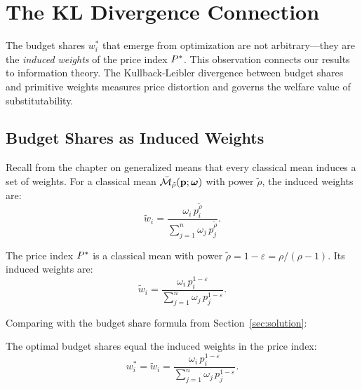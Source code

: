
\section{The KL Divergence Connection}
\label{sec:kl-connection}

The budget shares $w_i^*$ that emerge from optimization are not arbitrary---they are the \emph{induced weights} of the price index $P^{*}$. This observation connects our results to information theory. The Kullback-Leibler divergence between budget shares and primitive weights measures price distortion and governs the welfare value of substitutability.

\subsection{Budget Shares as Induced Weights}
\label{subsec:induced-weights}

Recall from the chapter on generalized means that every classical mean induces a set of weights. For a classical mean $\bar{\mathcal{M}}_{\tilde{\rho}}(\mathbf{p}; \boldsymbol{\omega})$ with power $\tilde{\rho}$, the induced weights are:
\begin{equation}
\tilde{w}_i = \frac{\omega_i \, p_i^{\tilde{\rho}}}{\sum_{j=1}^{n} \omega_j \, p_j^{\tilde{\rho}}}.
\end{equation}

The price index $P^{*}$ is a classical mean with power $\tilde{\rho} = 1 - \varepsilon = \rho/(\rho-1)$. Its induced weights are:
\begin{equation}
\tilde{w}_i = \frac{\omega_i \, p_i^{1-\varepsilon}}{\sum_{j=1}^{n} \omega_j \, p_j^{1-\varepsilon}}.
\end{equation}

Comparing with the budget share formula from Section~\ref{sec:solution}:

\begin{proposition}
\label{prop:shares-induced}
The optimal budget shares equal the induced weights in the price index:
\begin{equation}
w_i^* = \tilde{w}_i = \frac{\omega_i \, p_i^{1-\varepsilon}}{\sum_{j=1}^{n} \omega_j \, p_j^{1-\varepsilon}}.
\end{equation}
\end{proposition}

